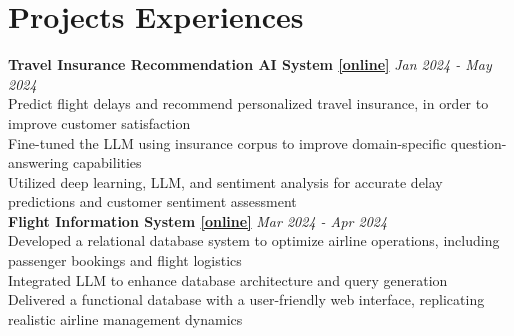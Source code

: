 \documentclass[a4paper,8pt]{article}
\begin{document}
\section*{Projects Experiences}
\textbf{Travel Insurance Recommendation AI System \href{https://tobyyang7.github.io/assets/pdf/Travel_Delay_Insurance_Recommendation_AI_System.pdf}{[online]}} \hfill \textit{Jan 2024 - May 2024}\\
\textbullet Predict flight delays and recommend personalized travel insurance, in order to improve customer satisfaction\\
\textbullet Fine-tuned the LLM using insurance corpus to improve domain-specific question-answering capabilities\\
\textbullet Utilized deep learning, LLM, and sentiment analysis for accurate delay predictions and customer sentiment assessment\\
\textbf{Flight Information System \href{https://github.com/TobyYang7/Flight-Information-System}{[online]}} \hfill \textit{Mar 2024 - Apr 2024}\\
\textbullet Developed a relational database system to optimize airline operations, including passenger bookings and flight logistics\\
\textbullet Integrated LLM to enhance database architecture and query generation\\
\textbullet Delivered a functional database with a user-friendly web interface, replicating realistic airline management dynamics\\
\end{document}
